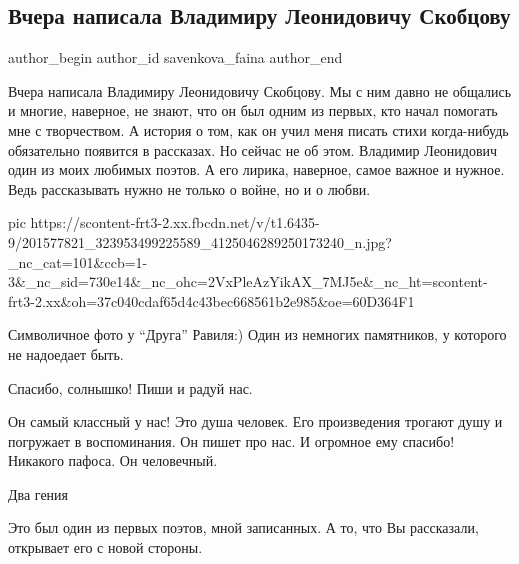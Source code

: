 
 
 
 
 
 
\subsection{Вчера написала Владимиру Леонидовичу Скобцову}
\label{sec:19_06_2021.fb.savenkova_faina.1.skobcov_vladimir}
\ifcmt
 author_begin
   author_id savenkova_faina
 author_end
\fi

Вчера написала Владимиру Леонидовичу Скобцову. Мы с ним давно не общались и
многие, наверное, не знают, что он был одним из первых, кто начал помогать мне
с творчеством. А история о том, как он учил меня писать стихи когда-нибудь
обязательно появится в рассказах. Но сейчас не об этом. Владимир Леонидович
один из моих любимых поэтов. А его лирика, наверное, самое важное и нужное.
Ведь рассказывать нужно не только о войне, но и о любви.

\ifcmt
  pic https://scontent-frt3-2.xx.fbcdn.net/v/t1.6435-9/201577821_323953499225589_4125046289250173240_n.jpg?_nc_cat=101&ccb=1-3&_nc_sid=730e14&_nc_ohc=2VxPleAzYikAX_7MJ5e&_nc_ht=scontent-frt3-2.xx&oh=37c040cdaf65d4c43bec668561b2e985&oe=60D364F1
\fi

\begin{itemize}
Символичное фото у \enquote{Друга} Равиля:) Один из немногих памятников, у которого не надоедает быть.

Спасибо, солнышко! Пиши и радуй нас.


Он самый классный у нас! Это душа человек. Его произведения трогают душу и погружает в воспоминания. Он пишет про нас. И огромное ему спасибо! Никакого пафоса. Он человечный.

Два гения

Это был один из первых поэтов, мной записанных. А то, что Вы рассказали, открывает его с новой стороны.
\end{itemize}

